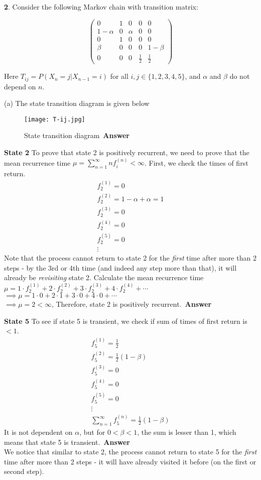 \textbf{2}. Consider the following Markov chain with transition matrix:

\[
\begin{pmatrix}
  0 & 1 & 0 & 0 & 0 \\
  1-\alpha & 0 & \alpha & 0 & 0 \\
  0 & 1 & 0 & 0 & 0 \\
  \beta & 0 & 0 & 0 & 1-\beta \\
  0 & 0 & 0 & \frac{1}{2} & \frac{1}{2}
\end{pmatrix}
\]

Here $T_{ij} = P(X_n = j | X_{n-1} = i)$ for all $i,j \in \{1,2,3,4,5\}$, and $\alpha$ and $\beta$ do not depend on $n$. 

(a) The state transition diagram is given below
\begin{figure}[H]
\centering
\texttt{[image: T-ij.jpg]}
\caption{\label{fig:T-ij}State transition diagram\ \textbf{Answer}}
\end{figure}
\textbf{State 2}
To prove that state 2 is positively recurrent, we need to prove that the mean recurrence time $\mu=\sum_{n=1}^{\infty}nf_{i}^{(n)} < \infty$. First, we check the times of first return.
\begin{gather*}
f_2^{(1)} = 0 \\
f_2^{(2)} = 1 - \alpha + \alpha = 1\\
f_2^{(3)} = 0 \\
f_2^{(4)} = 0 \\
f_2^{(5)} = 0 \\
\vdots 
\end{gather*}
Note that the process cannot return to state 2 for the \textit{first} time after more than 2 steps - by the 3rd or 4th time (and indeed any step more than that), it will already be \textit{revisiting} state 2. Calculate the mean recurrence time $\mu= 1\cdot f_{2}^{(1)} + 2\cdot f_{2}^{(2)} + 3\cdot f_{2}^{(3)} + 4\cdot f_{2}^{(4)} + \cdots$\\
$\implies \mu = 1\cdot 0 + 2\cdot 1 + 3\cdot 0 + 4\cdot 0 + \cdots$\\
$\implies \mu = 2 < \infty$,
Therefore, state 2 is positively recurrent.\ \textbf{Answer}

\textbf{State 5} To see if state 5 is transient, we check if sum of times of first return is $< 1$.
\begin{gather*}
f_5^{(1)} = \frac{1}{2} \\
f_5^{(2)} = \frac{1}{2}(1 - \beta) \\
f_5^{(3)} = 0 \\
f_5^{(4)} = 0 \\
f_5^{(5)} = 0 \\
\vdots\\
\sum_{n=1}^{\infty}f_{5}^{(n)} = \frac{1}{2}(1 - \beta)
\end{gather*}
It is not dependent on $\alpha$, but for $0<\beta<1$, the sum is lesser than 1, which means that state 5 is transient.\ \textbf{Answer}\\
We notice that similar to state 2, the process cannot return to state 5 for the \textit{first} time after more than 2 steps - it will have already visited it before (on the first or second step).

